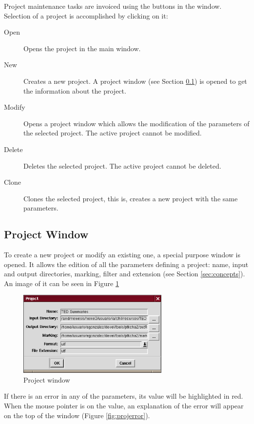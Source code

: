\documentclass{article}
\begin{document}
Project maintenance tasks are invoiced using the buttons in the
window. Selection of a project is accomplished by clicking on it:

\begin{description}
\item[Open] Opens the project in the main window.
\item[New] Creates a new project. A project window (see Section
\ref{sec:projwin}) is opened to get the information about the project.
\item[Modify] Opens a project window which allows the modification of
the parameters of the selected project. The active project cannot be
modified.
\item[Delete] Deletes the selected project. The active project cannot
be deleted.
\item[Clone] Clones the selected project, this is, creates a new
project with the same parameters.
\end{description}

\subsection{Project Window}
\label{sec:projwin}

To create a new project or modify an existing one, a special purpose
window is opened. It allows the edition of all the parameters defining
a project: name, input and output directories, marking, filter and
extension (see Section \ref{sec:concepts}). An image of it can be seen
in Figure \ref{fig:projwin}

\begin{figure}[ht]
\begin{center}

\includegraphics[width=75mm]{img/project.eps}

\caption{Project window}
\label{fig:projwin}
\end{center}
\end{figure}

If there is an error in any of the parameters, its value will be
highlighted in red. When the mouse pointer is on the value, an
explanation of the error will appear on the top of the window (Figure
\ref{fig:projerror}).
\end{document}
